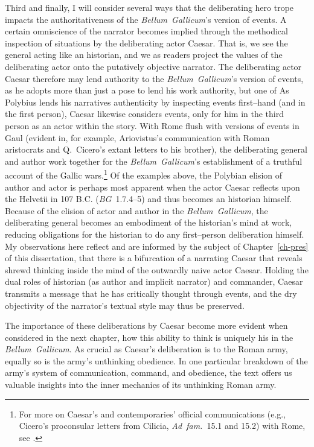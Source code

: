 \documentclass[12pt,letterpaper,oneside,final]{memoir}
\begin{document}
Third and finally, I will consider several ways that the deliberating hero trope impacts the authoritativeness of the \emph{Bellum~Gallicum}'s version of events. A certain omniscience of the narrator becomes implied through the methodical inspection of situations by the deliberating actor Caesar. That is, we see the general acting like an historian, and we as readers project the values of the deliberating actor onto the putatively objective narrator. The deliberating actor Caesar therefore may lend authority to the \emph{Bellum~Gallicum}'s version of events, as he adopts more than just a  pose to lend his work authority, but one of  As Polybius lends his narratives authenticity by inspecting events first--hand (and in the first person), Caesar likewise considers events, only for him in the third person as an actor within the story. With Rome flush with versions of events in Gaul (evident in, for example, Ariovistus's communication with Roman aristocrats and Q.~Cicero's extant letters to his brother), the deliberating general and author work together for the \emph{Bellum~Gallicum}'s establishment of a truthful account of the Gallic wars.\footnote{For more on Caesar's and contemporaries' official communications (e.g., Cicero's proconsular letters from Cilicia, \emph{Ad~fam.}~15.1 and 15.2) with Rome, see \textcite[338--349]{osgood2009}.} Of the examples above, the Polybian elision of author and actor is perhaps most apparent when the actor Caesar reflects upon the Helvetii in 107 B.C. (\emph{BG}~1.7.4--5) and thus becomes an historian himself. Because of the elision of actor and author in the \emph{Bellum~Gallicum}, the deliberating general becomes an embodiment of the historian's mind at work, reducing obligations for the historian to do any first--person deliberation himself. My observations here reflect and are informed by the subject of Chapter~\ref{ch-pres} of this dissertation, that there is a bifurcation of a narrating Caesar that reveals shrewd thinking inside the mind of the outwardly naive actor Caesar. Holding the dual roles of historian (as author and implicit narrator) and commander, Caesar transmits a message that he has critically thought through events, and the dry objectivity of the narrator's textual style may thus be preserved.

The importance of these deliberations by Caesar become more evident when considered in the next chapter, how this ability to think is uniquely his in the \emph{Bellum~Gallicum}. As crucial as Caesar's deliberation is to the Roman army, equally so is the army's unthinking obedience. In one particular breakdown of the army's system of communication, command, and obedience, the text offers us valuable insights into the inner mechanics of its unthinking Roman army.
\end{document}

